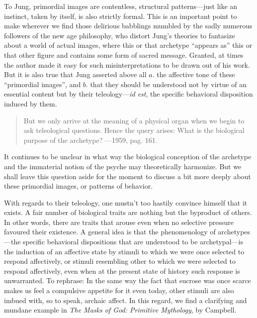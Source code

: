 \documentclass[a4paper]{article}
\begin{document}
    To Jung, primordial images are contentless, structural patterns—just like an
    instinct, taken by itself, is also strictly formal. This is an important
    point to make wherever we find those delirious babblings mumbled by the
    sadly numerous followers of the new age philosophy, who distort Jung's
    theories to fantasize about a world of actual images, where this or that
    archetype “appears as” this or that other figure and contains some form of
    sacred message. Granted, at times the author made it easy for such
    misinterpretations to be drawn out of his work. But it is also true that
    Jung asserted above all $a.$ the affective tone of these “primordial images”,
    and $b.$ that they should be understood not by virtue of an essential content
    but by their teleology—\textit{id est}, the specific behavioral disposition induced
    by them. 

    \begin{quote}
    But we only arrive at the meaning of a physical organ when we begin to ask
    teleological questions. Hence the query arises: What is the biological
    purpose of the archetype? —1959, pag. 161. 
    \end{quote}


    It continues to be unclear in what way the biological conception
    of the archetype and the immaterial notion of the psyche may theoretically
    harmonize. But we shall leave this question aside for the moment to discuss
    a bit more deeply about these primordial images, or patterns of behavior.

    With regards to their teleology, one mustn't too hastily convince himself
    that it exists. A fair number of biological traits are nothing but the
    byproduct of others. In other words, there are traits that arouse
    even when no selective pressure favoured their existence. A general idea is
    that the phenomenology of archetypes---the specific behavioral dispositions
    that are understood to be archetypal---is the induction of an affective
    state by stimuli to which we were once selected to respond affectively, or
    stimuli resembling other to which we were selected to respond affectively,
    even when at the present state of history such response is unwarranted.
    To rephrase: In the same way the fact that sucrose was once scarce makes us feel a
    compulsive appetite for it even today, other stimuli are also imbued with,
    so to speak, archaic affect. In this regard, we find a clarifying and
    mundane example in \textit{The Masks of God: Primitive Mythology}, by
    Campbell. 
\end{document}
